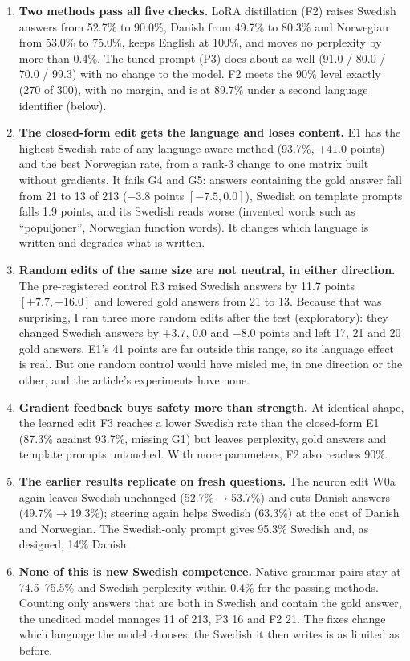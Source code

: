 \documentclass[10pt,a4paper]{article}
\newcommand{\up}{$\rightarrow$}
\begin{document}
\begin{enumerate}
\item \textbf{Two methods pass all five checks.} LoRA distillation (F2) raises Swedish answers from 52.7\% to 90.0\%, Danish from 49.7\% to 80.3\% and Norwegian from 53.0\% to 75.0\%, keeps English at 100\%, and moves no perplexity by more than 0.4\%. The tuned prompt (P3) does about as well (91.0 / 80.0 / 70.0 / 99.3) with no change to the model. F2 meets the 90\% level exactly (270 of 300), with no margin, and is at 89.7\% under a second language identifier (below).
\item \textbf{The closed-form edit gets the language and loses content.} E1 has the highest Swedish rate of any language-aware method (93.7\%, $+41.0$ points) and the best Norwegian rate, from a rank-3 change to one matrix built without gradients. It fails G4 and G5: answers containing the gold answer fall from 21 to 13 of 213 ($-3.8$ points $[-7.5, 0.0]$), Swedish on template prompts falls 1.9 points, and its Swedish reads worse (invented words such as ``populjoner'', Norwegian function words). It changes which language is written and degrades what is written.
\item \textbf{Random edits of the same size are not neutral, in either direction.} The pre-registered control R3 raised Swedish answers by 11.7 points $[+7.7, +16.0]$ and lowered gold answers from 21 to 13. Because that was surprising, I ran three more random edits after the test (exploratory): they changed Swedish answers by $+3.7$, $0.0$ and $-8.0$ points and left 17, 21 and 20 gold answers. E1's 41 points are far outside this range, so its language effect is real. But one random control would have misled me, in one direction or the other, and the article's experiments have none.
\item \textbf{Gradient feedback buys safety more than strength.} At identical shape, the learned edit F3 reaches a lower Swedish rate than the closed-form E1 (87.3\% against 93.7\%, missing G1) but leaves perplexity, gold answers and template prompts untouched. With more parameters, F2 also reaches 90\%.
\item \textbf{The earlier results replicate on fresh questions.} The neuron edit W0a again leaves Swedish unchanged (52.7\%\up53.7\%) and cuts Danish answers (49.7\%\up19.3\%); steering again helps Swedish (63.3\%) at the cost of Danish and Norwegian. The Swedish-only prompt gives 95.3\% Swedish and, as designed, 14\% Danish.
\item \textbf{None of this is new Swedish competence.} Native grammar pairs stay at 74.5--75.5\% and Swedish perplexity within 0.4\% for the passing methods. Counting only answers that are both in Swedish and contain the gold answer, the unedited model manages 11 of 213, P3 16 and F2 21. The fixes change which language the model chooses; the Swedish it then writes is as limited as before.
\end{enumerate}
\end{document}
